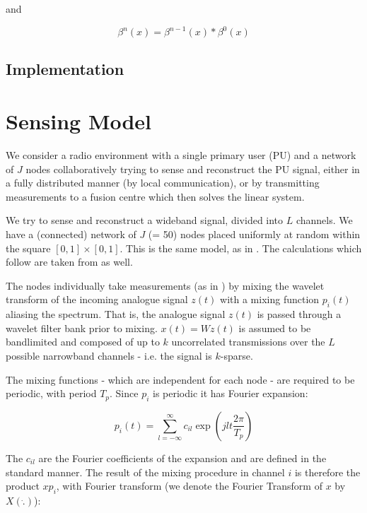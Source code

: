 \documentclass{article}
\begin{document}
and

\begin{equation}
\beta^n\left(x\right) = \beta^{n-1}\left(x\right) * \beta^0\left(x\right)
\end{equation}

\subsection{Implementation}



\section{Sensing Model}\label{sensing-model}

We consider a radio environment with a single primary user (PU) and a network of \(J\) nodes collaboratively trying to sense and reconstruct the PU signal, either in a fully distributed manner (by local communication), or by transmitting measurements to a fusion centre which then solves the linear system. 

We try to sense and reconstruct a wideband signal, divided into \(L\) channels. We have a (connected) network of \(J\) (= 50) nodes placed uniformly at random within the square \(  \left[0,1\right]\times \left[0,1\right] \). This is the same model, as in \cite{Zhang2011b}. The calculations which follow are taken from \cite{Zhang2011b} as well.

The nodes individually take measurements (as in \cite{mishali2010theory}) by mixing the wavelet transform of the incoming analogue signal \(z\left(t\right)\) with a mixing function \(p_i\left(t\right)\) aliasing the spectrum. That is, the analogue signal \(z\left(t\right)\) is passed through a wavelet filter bank prior to mixing. \(x\left(t\right) = Wz\left(t\right)\) is assumed to be bandlimited and composed of up to \(k\) uncorrelated transmissions over the \(L\) possible narrowband channels - i.e. the signal is \(k\)-sparse. 

The mixing functions - which are independent for each node - are required to be periodic, with period \(T_p\). Since \(p_i\) is periodic it has Fourier expansion:

\begin{equation}
p_i\left(t\right) = \sum_{l=-\infty}^{\infty} c_{il} \exp\left({jlt\frac{2\pi}{T_p}}\right)
\end{equation}

The \(c_{il}\) are the Fourier coefficients of the expansion and are defined in the standard manner. The result of the mixing procedure in channel \(i\) is therefore the product \(xp_i\), with Fourier transform (we denote the Fourier Transform of \(x\) by \(X\left( \dot{.} \right)\)):
\end{document}
